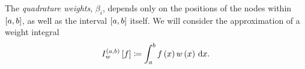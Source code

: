 \begin{frame}
    The \emph{quadrature weights}, $\beta_{i}$, depends only on the
    positions of the nodes within $\left[a,b\right]$, as well as the
    interval $\left[a,b\right]$ itself.
    We will consider the approximation of a weight integral
    \begin{equation*}
        I^{\openinterval}_{w}
        \left[f\right]\coloneqq
        \int_{a}^{b}
        f\left(x\right)
        w\left(x\right)
        \dl x.
    \end{equation*}


\end{frame}
